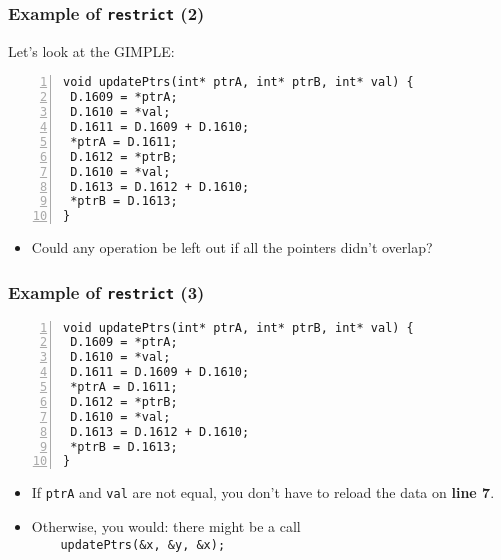 \documentclass[aspectratio=43]{beamer}
\newenvironment{changemargin}[1]{%
  \begin{list}{}{%
    \setlength{\topsep}{0pt}%
    \setlength{\leftmargin}{#1}%
    \setlength{\rightmargin}{1em}
    \setlength{\listparindent}{\parindent}%
    \setlength{\itemindent}{\parindent}%
    \setlength{\parsep}{\parskip}%
  }%
  \item[]}{\end{list}}
\begin{document}
\begin{frame}[fragile]
  \frametitle{Example of {\tt restrict} (2)}

  \begin{changemargin}{2.5cm}
    Let's look at the GIMPLE:

  \begin{lstlisting}[numbers=left]
void updatePtrs(int* ptrA, int* ptrB, int* val) {
 D.1609 = *ptrA;
 D.1610 = *val;
 D.1611 = D.1609 + D.1610;
 *ptrA = D.1611;
 D.1612 = *ptrB;
 D.1610 = *val;
 D.1613 = D.1612 + D.1610;
 *ptrB = D.1613;
}
  \end{lstlisting}

  \begin{itemize}
    \item Could any operation be left out if all the pointers
      didn't overlap?
  \end{itemize}  
  \end{changemargin}

\end{frame}

\begin{frame}[fragile]
  \frametitle{Example of {\tt restrict} (3)}

  \begin{changemargin}{2.5cm}
  \begin{lstlisting}[numbers=left]
void updatePtrs(int* ptrA, int* ptrB, int* val) {
 D.1609 = *ptrA;
 D.1610 = *val;
 D.1611 = D.1609 + D.1610;
 *ptrA = D.1611;
 D.1612 = *ptrB;
 D.1610 = *val;
 D.1613 = D.1612 + D.1610;
 *ptrB = D.1613;
}
  \end{lstlisting}
  \begin{itemize}
    \item If {\tt ptrA} and {\tt val} are not equal, you don't have to
      reload the data on {\bf line 7}.
    \item Otherwise, you would: there might be a call\\{\tt ~~~~updatePtrs(\&x, \&y,
      \&x);}
  \end{itemize}
  \end{changemargin}
\end{frame}
\end{document}
